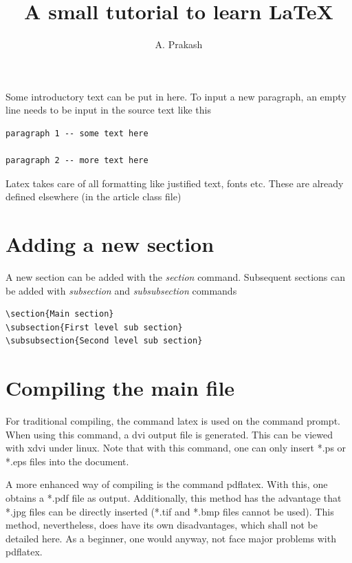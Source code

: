 \documentclass[a4paper,12pt,times]{article} %
\title{A small tutorial to learn \LaTeX}
\author{A. Prakash}
\begin{document}
\maketitle

Some introductory text can be put in here. To input a new paragraph, an empty line needs to be input in the source text like this
\begin{verbatim}
paragraph 1 -- some text here

paragraph 2 -- more text here
\end{verbatim}

Latex takes care of all formatting like justified text, fonts etc. These are already defined elsewhere (in the article class file)

\section{Adding a new section}
A new section can be added with the \emph{section} command. Subsequent sections can be added with \emph{subsection} and \emph{subsubsection} commands
\begin{verbatim}
\section{Main section}
\subsection{First level sub section}
\subsubsection{Second level sub section}
\end{verbatim}

\section{Compiling the main file}
For traditional compiling, the command latex is used on the command prompt. When using this command, a dvi output file is generated. This can be viewed with xdvi under linux. Note that with this command, one can only insert *.ps or *.eps files into the document.

A more enhanced way of compiling is the command pdflatex. With this, one obtains a *.pdf file as output. Additionally, this method has the advantage that *.jpg files can be directly inserted (*.tif and *.bmp files cannot be used). This method, nevertheless, does have its own disadvantages, which shall not be detailed here. As a beginner, one would anyway, not face major problems with pdflatex.
\end{document}
